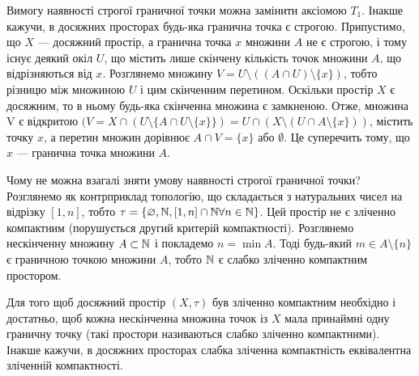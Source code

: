 \begin{remark}
Вимогу наявності строгої граничної
точки можна замінити аксіомою $T_1$. Інакше кажучи, в
досяжних просторах будь-яка гранична точка є строгою.
Припустимо, що $X$ --- досяжний простір, а гранична точка
$x$ множини $A$ не є строгою, і тому існує деякий окіл $U$, що
містить лише скінчену кількість точок множини $A$, що
відрізняються від $x$. Розглянемо множину
$V = U \setminus ((A \cap U) \setminus \{x\})$,
тобто різницю між множиною $U$ і
цим скінченним перетином. Оскільки простір $X$ є
досяжним, то в ньому будь-яка скінченна множина є
замкненою. Отже, множина V є відкритою
$(V = X \cap (U \setminus \{A \cap U \setminus \{x\}\}) =
U \cap (X \setminus (U \cap A \setminus \{x\}))$, містить
точку $x$, а перетин множин дорівнює $A \cap V = \{x\}$ або $\emptyset$. Це
суперечить тому, що $x$ --- гранична точка множини $A$.
\end{remark}

\begin{remark}
Чому не можна взагалі зняти умову
наявності строгої граничної точки? Розглянемо як
контрприклад топологію, що складається з натуральних
чисел на відрізку $[1, n]$, тобто
$\tau = \{\varnothing, \mathbb{N}, [1, n] \cap \mathbb{N} \forall n \in \mathbb{N}\}$.
Цей простір не є зліченно компактним (порушується другий
критерій компактності). Розглянемо нескінченну множину
$A \subset \mathbb{N}$ і покладемо $n = \min A$.
Тоді будь-який $m \in A \setminus \{n\}$ є
граничною точкою множини $A$, тобто $\mathbb{N}$ є слабко зліченно
компактним простором.
\end{remark}

\begin{theorem}
Для того щоб досяжний простір $(X, \tau)$ був
зліченно компактним необхідно і достатньо, щоб кожна
нескінченна множина точок із $X$ мала принаймні одну
граничну точку (такі простори називаються слабко
зліченно компактними). Інакше кажучи, в досяжних
просторах слабка зліченна компактність еквівалентна
зліченній компактності.
\end{theorem}

